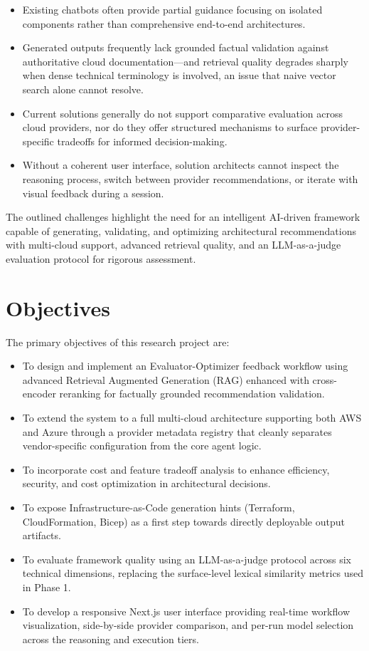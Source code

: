 \begin{itemize}
    \item Existing chatbots often provide partial guidance focusing on isolated components rather than comprehensive end-to-end architectures.
    \item Generated outputs frequently lack grounded factual validation against authoritative cloud documentation---and retrieval quality degrades sharply when dense technical terminology is involved, an issue that naive vector search alone cannot resolve.
    \item Current solutions generally do not support comparative evaluation across cloud providers, nor do they offer structured mechanisms to surface provider-specific tradeoffs for informed decision-making.
    \item Without a coherent user interface, solution architects cannot inspect the reasoning process, switch between provider recommendations, or iterate with visual feedback during a session.
\end{itemize}

The outlined challenges highlight the need for an intelligent AI-driven framework capable of generating, validating, and optimizing architectural recommendations with multi-cloud support, advanced retrieval quality, and an LLM-as-a-judge evaluation protocol for rigorous assessment. %

\section{Objectives}

The primary objectives of this research project are:

\begin{itemize}
    \item To design and implement an Evaluator-Optimizer feedback workflow using advanced Retrieval Augmented Generation (RAG) enhanced with cross-encoder reranking for factually grounded recommendation validation.
    \item To extend the system to a full multi-cloud architecture supporting both AWS and Azure through a provider metadata registry that cleanly separates vendor-specific configuration from the core agent logic.
    \item To incorporate cost and feature tradeoff analysis to enhance efficiency, security, and cost optimization in architectural decisions.
    \item To expose Infrastructure-as-Code generation hints (Terraform, CloudFormation, Bicep) as a first step towards directly deployable output artifacts.
    \item To evaluate framework quality using an LLM-as-a-judge protocol across six technical dimensions, replacing the surface-level lexical similarity metrics used in Phase 1.
    \item To develop a responsive Next.js user interface providing real-time workflow visualization, side-by-side provider comparison, and per-run model selection across the reasoning and execution tiers.
\end{itemize}

